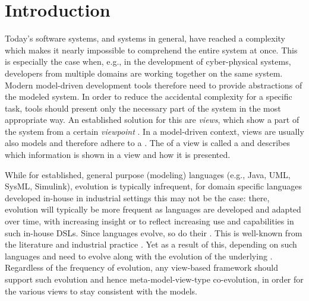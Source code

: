 \section{Introduction}
\label{sec:Introduction}

Today's software systems, and systems in general, have reached a complexity which makes it nearly impossible to comprehend the entire system at once.
This is especially the case when, e.g., in the development of cyber-physical systems, developers from multiple domains are working together on the same system.
Modern model-driven development tools therefore need to provide abstractions of the modeled system.
In order to reduce the accidental complexity for a specific task, tools should present only the necessary part of the system in the most appropriate way.
An established solution for this are \emph{views}, which show a part of the system from a certain \emph{viewpoint} \autocite{atkinson_orthographic_2010}.
In a model-driven context, views are usually also models and therefore adhere to a \metamodel.
The \metamodel of a view is called a \emph{\viewtype} \autocite{goldschmidt_towards_2012} and describes which information is shown in a view and how it is presented.

While for established, general purpose (modeling) languages (e.g., Java, UML, SysML, Simulink), evolution is typically infrequent, for domain specific languages developed in-house in industrial settings this may not be the case: there, evolution will typically be more frequent as languages are developed and adapted over time, with increasing insight or to reflect increasing use and capabilities in such in-house DSLs. Since languages evolve, so do their \metamodels. This is well-known from the literature and industrial practice \cite{durisic_evolution_2014}. Yet as a result of this, \viewtypes depending on such languages and \metamodels need to evolve along with the evolution of the underlying \metamodels. Regardless of the frequency of \metamodel evolution, any view-based framework should support such evolution and hence meta-model-view-type co-evolution, in order for the various views to stay consistent with the models. 

